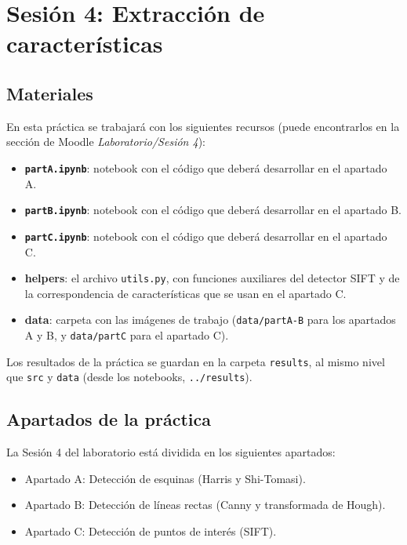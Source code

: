 \chapter{Sesión 4: Extracción de características}
\label{chapter:introduction_ses_4}

\section{Materiales}

En esta práctica se trabajará con los siguientes recursos (puede encontrarlos en la sección de Moodle \textit{Laboratorio/Sesión 4}):

\begin{itemize}
    \item \textbf{\texttt{partA.ipynb}}: notebook con el código que deberá desarrollar en el apartado A.
    \item \textbf{\texttt{partB.ipynb}}: notebook con el código que deberá desarrollar en el apartado B.
    \item \textbf{\texttt{partC.ipynb}}: notebook con el código que deberá desarrollar en el apartado C.
    \item \textbf{helpers}: el archivo \texttt{utils.py}, con funciones auxiliares del detector SIFT y de la correspondencia de características que se usan en el apartado C.
    \item \textbf{data}: carpeta con las imágenes de trabajo (\texttt{data/partA-B} para los apartados A y B, y \texttt{data/partC} para el apartado C).
\end{itemize}

Los resultados de la práctica se guardan en la carpeta \texttt{results}, al mismo nivel que \texttt{src} y \texttt{data} (desde los notebooks, \texttt{../results}).

\section{Apartados de la práctica}

La Sesión 4 del laboratorio está dividida en los siguientes apartados:

\begin{itemize}
    \item Apartado A: Detección de esquinas (Harris y Shi-Tomasi).
    \item Apartado B: Detección de líneas rectas (Canny y transformada de Hough).
    \item Apartado C: Detección de puntos de interés (SIFT).
\end{itemize}

